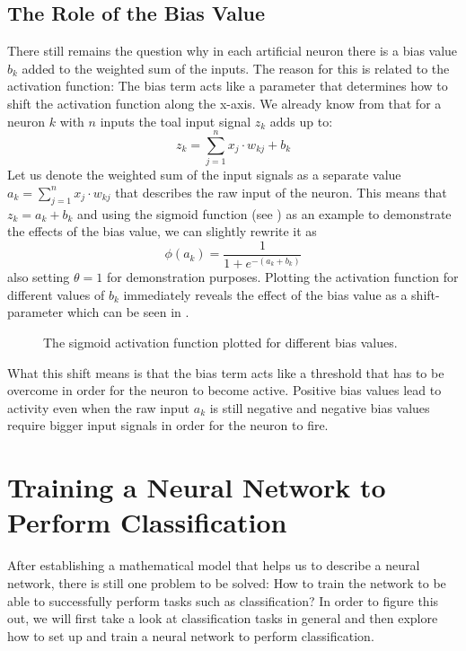 \subsection{The Role of the Bias Value}
\label{sec:bias}
There still remains the question why in each artificial neuron there
is a bias value \(b_k\) added to the weighted sum of the inputs. The
reason for this is related to the activation function: The bias term
acts like a parameter that determines how to shift the activation
function along the x-axis. We already know from  that
for a neuron \(k\) with \(n\) inputs the toal input signal \(z_k\)
adds up to:
\begin{equation*}
  z_k = \sum_{j=1}^{n}{x_j \cdot w_{kj}} + b_k
\end{equation*}
Let us denote the weighted sum of the input signals as a separate
value \(a_k = \sum_{j=1}^{n}{x_j \cdot w_{kj}}\) that describes the raw
input of the neuron. This means that \(z_k
= a_k + b_k\) and using the sigmoid function (see ) as an example to
demonstrate the effects of the bias value, we can slightly rewrite it as
\begin{equation*}
  \phi(a_k) = \frac{1}{1+e^{-(a_k+b_k)}}
\end{equation*}
also setting \(\theta = 1\) for demonstration purposes. Plotting the
activation function for
different values of \(b_k\) immediately reveals the effect of the bias
value as a shift-parameter which can be seen in .
\begin{figure}[h]
  \centering
  
  \caption{The sigmoid activation function plotted for different bias values.}
  \label{fig:bias}
\end{figure}

What this shift means is that the bias term acts like a threshold that
has to be overcome in order for the neuron to become active. Positive
bias values lead to activity even when the raw input \(a_k\) is still
negative and negative bias values require bigger input signals in
order for the neuron to fire.

\section{Training a Neural Network to Perform Classification}

After establishing a mathematical model that helps us to describe a
neural network, there is still one problem to be solved: How to train
the network to be able to successfully perform tasks such as
classification? In order to figure this out, we will first take a look at
classification tasks in general and then explore how to set up and
train a neural network to perform classification.

